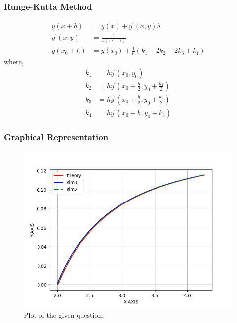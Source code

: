 \documentclass{beamer}
\begin{document}
\begin{frame}
\frametitle{Runge-Kutta Method}
\begin{align}
	y(x + h) &= y(x) + y^{\prime}(x,y) h \\
	y^{\prime} (x,y) &= \frac{1}{x \left( {x^2 - 1} \right)} \\
	y(x_0 + h) &= y(x_0) + \frac{1}{6} \left( {k_1 + 2k_2 + 2k_3 + k_4} \right)
\end{align}
where,
\begin{align}
	k_1 &= h y^{\prime} ({x_0, y_0}) \\
	k_2 &= h y^{\prime} ({x_0 + \frac{h}{2}, y_0 + \frac{k_1}{2}}) \\
	k_3 &= h y^{\prime} \left( {x_0 + \frac{h}{2}, y_0 + \frac{k_2}{2}} \right)\\
	k_4 &= h y^{\prime} \left( {x_0 + h, y_0 + k_3} \right)
\end{align}
\end{frame}

\begin{frame}
\frametitle{Graphical Representation}
\begin{figure}[h]
	\centering
	\includegraphics[width=\columnwidth]{fig.png}
	\caption{Plot of the given question.}
	\label{fig:Plot1}
\end{figure}
\end{frame}
\end{document}
